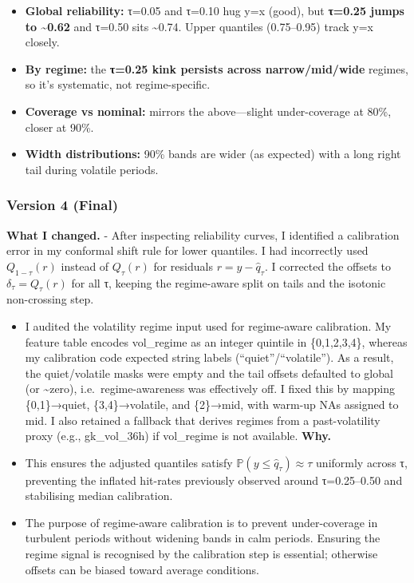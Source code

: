 \documentclass[
  a4paper,
  DIV=11,
  numbers=noendperiod]{scrreprt}
\providecommand{\tightlist}{%
  \setlength{\itemsep}{0pt}\setlength{\parskip}{0pt}}
\begin{document}
\begin{itemize}
\tightlist
\item
  \textbf{Global reliability:} τ=0.05 and τ=0.10 hug y=x (good), but
  \textbf{τ=0.25 jumps to \textasciitilde0.62} and τ=0.50 sits
  \textasciitilde0.74. Upper quantiles (0.75--0.95) track y=x closely.
\item
  \textbf{By regime:} the \textbf{τ=0.25 kink persists across
  narrow/mid/wide} regimes, so it's systematic, not regime-specific.
\item
  \textbf{Coverage vs nominal:} mirrors the above---slight
  under-coverage at 80\%, closer at 90\%.
\item
  \textbf{Width distributions:} 90\% bands are wider (as expected) with
  a long right tail during volatile periods.
\end{itemize}

\subsubsection{Version 4 (Final)}\label{version-4-final}

\textbf{What I changed.} - After inspecting reliability curves, I
identified a calibration error in my conformal shift rule for lower
quantiles. I had incorrectly used \(Q_{1-\tau}(r)\) instead of
\(Q_{\tau}(r)\) for residuals \(r = y-\hat{q}_\tau\). I corrected the
offsets to \(\delta_\tau = Q_{\tau}(r)\) for all τ, keeping the
regime-aware split on tails and the isotonic non-crossing step.

\begin{itemize}
\item
  I audited the volatility regime input used for regime-aware
  calibration. My feature table encodes vol\_regime as an integer
  quintile in \{0,1,2,3,4\}, whereas my calibration code expected string
  labels (``quiet''/``volatile''). As a result, the quiet/volatile masks
  were empty and the tail offsets defaulted to global (or
  \textasciitilde zero), i.e.~regime-awareness was effectively off. I
  fixed this by mapping \{0,1\}→quiet, \{3,4\}→volatile, and \{2\}→mid,
  with warm-up NAs assigned to mid. I also retained a fallback that
  derives regimes from a past-volatility proxy (e.g., gk\_vol\_36h) if
  vol\_regime is not available. \textbf{Why.}
\item
  This ensures the adjusted quantiles satisfy
  \(\mathbb{P}(y \le \hat{q}_\tau) \approx \tau\) uniformly across τ,
  preventing the inflated hit-rates previously observed around
  τ=0.25--0.50 and stabilising median calibration.
\item
  The purpose of regime-aware calibration is to prevent under-coverage
  in turbulent periods without widening bands in calm periods. Ensuring
  the regime signal is recognised by the calibration step is essential;
  otherwise offsets can be biased toward average conditions.
\end{itemize}
\end{document}
